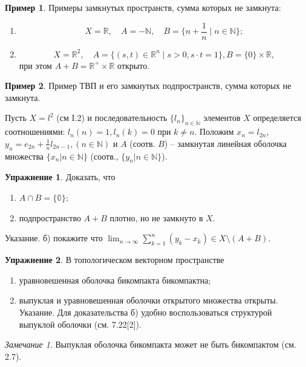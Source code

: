 \documentclass[a4paper, 12pt]{article}
\theoremstyle{definition}
\newtheorem{example}{Пример}
\newtheorem{problem}{Упражнение}[section]
\theoremstyle{remark}
\newtheorem*{remark}{Замечание}
\begin{document}
\begin{example}
    Примеры замкнутых пространств, сумма которых не замкнута:
    \begin{enumerate}
        \item \[X = \mathbb{R}, \quad A = -\mathbb{N}, \quad B = \{n+\frac1n \;|\; n\in \mathbb{N}\};\]
        \item \[X = \mathbb{R}^2,\quad A = \{(s, t)\in \mathbb{R}^n \;|\; s>0, s\cdot t = 1\}, B = \{0\}\times \mathbb{R}, \]
        при этом $A+B = \mathbb{R}^+ \times \mathbb R$ открыто.
    \end{enumerate}
\end{example}
\begin{example}
    Пример ТВП и его замкнутых подпространств, сумма которых не замкнута.

    Пусть $X = l^2$ (см I.2) и последовательность $\{l_n\}_{n\in \mathbb{N}}$ элементов $X$ определяется соотношениями: $l_n(n) = 1, l_n(k) = 0$ при $k\neq n$. Положим $x_n = l_{2n}$, $y_n = e_{2n} +\frac{1}{n}l_{2n-1}, (n\in \mathbb{N})$ и $A$ (соотв. $B$) -- замкнутая линейная оболочка множества $\{x_n | n\in \mathbb{N}\}$ (соотв., $\{y_n | n\in \mathbb{N}\}$).
\end{example}
\begin{problem}
    Доказать, что 
    \begin{enumerate}
        \item $A\cap B=\{\mathbb{0}\}$;
        \item подпространство $A+B$ плотно, но не замкнуто в $X$.
    \end{enumerate}
    Указание. б) покажите что $\lim_{n\to\infty}\sum_{k=1}^{n}(y_k-x_k)\in X \setminus (A + B)$.
\end{problem}
\begin{problem}
    В топологическом векторном пространстве
    \begin{enumerate}
        \item уравновешенная оболочка бикомпакта бикомпактна;
        \item выпуклая и уравновешенная оболочки открытого множества открыты.
        Указание. Для доказательства б) удобно воспользоваться структурой выпуклой оболочки (см. 7.22[2]).
    \end{enumerate}
    
\end{problem}
\begin{remark}
    Выпуклая оболочка бикомпакта может не быть бикомпактом (см. 2.7).
\end{remark}
\end{document}
